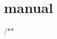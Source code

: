 \chapter{manual }
\hypertarget{md_doc_2manual}{}\label{md_doc_2manual}
/\+\texorpdfstring{$\ast$}{*}\texorpdfstring{$\ast$}{*} 